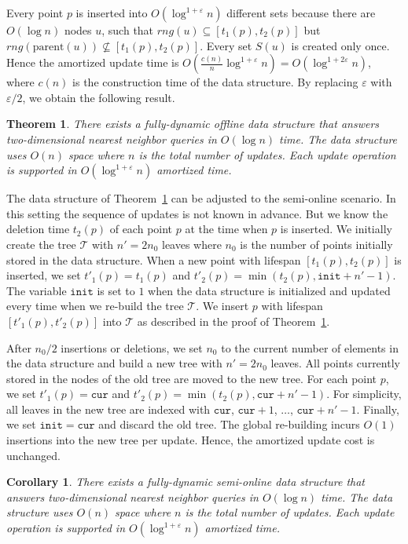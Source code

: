 \documentclass[12pt,a4paper,USenglish,cleveref, autoref, thm-restate]{article}
\newcommand{\cur}{\mathtt{cur}}
\newcommand{\init}{\mathtt{init}}
\newcommand{\mcT}{\mathcal{T}}
\newcommand{\eps}{\varepsilon}
\newtheorem{theorem}{Theorem}
\newtheorem{corollary}{Corollary}
\newcommand{\cur}{\mathtt{cur}}
\newcommand{\init}{\mathtt{init}}
\newcommand{\mcT}{\mathcal{T}}
\newcommand{\eps}{\varepsilon}
\newcommand{\cur}{\mathtt{cur}}
\newcommand{\init}{\mathtt{init}}
\newcommand{\mcT}{\mathcal{T}}
\newcommand{\eps}{\varepsilon}
\begin{document}
Every point $p$ is inserted into $O(\log^{1+\eps} n)$ different sets because there are $O(\log n)$ nodes $u$, such that
$rng(u)\subseteq [t_{1}(p),t_{2}(p)]$ but $rng(\text{parent}(u))\not\subseteq [t_{1}(p),t_{2}(p)]$.  Every set $S(u)$ is created only once.  Hence the amortized update time is $O(\frac{c(n)}{n}\log^{1+\eps} n)=O(\log^{1+2\eps}n)$, where $c(n)$ is the construction time of the data structure. By replacing $\eps$ with $\eps/2$, we obtain the following result.  
\begin{theorem}
  \label{theor:offline}
  There exists a fully-dynamic offline data structure that answers two-dimensional nearest neighbor queries in $O(\log n)$ time. The data structure uses $O(n)$ space where $n$ is the total number of updates. Each update operation is supported in $O(\log^{1+\eps} n)$ amortized time.  
\end{theorem}

The data structure of Theorem~\ref{theor:offline} can be adjusted to the semi-online scenario.  In this setting the sequence of updates is not known in advance. But we know the deletion time $t_2(p)$ of each point $p$ at the time when $p$ is inserted. We initially create  the tree $\mcT$ with $n'=2n_0$ leaves where $n_0$ is the  number of points initially stored in the data structure. When a new point with lifespan $[t_1(p),t_2(p)]$ is inserted, we set $t'_1(p)=t_1(p)$ and $t'_2(p)=\min(t_2(p),\init +n'-1)$. The variable $\init$ is set to $1$ when the data structure is initialized and updated every time when we re-build the tree $\mcT$.  We insert $p$ with lifespan $[t'_1(p),t'_2(p)]$ into $\mcT$  as described in the proof of Theorem~\ref{theor:offline}.


After $n_0/2$ insertions or deletions, we set $n_0$ to the current number of elements in the data structure and  build a new tree with $n'=2n_0$ leaves.  All points currently stored in the nodes of the old tree are moved to the new tree. For each point $p$, we set $t'_{1}(p)=\cur$ and $t'_{2}(p)=\min(t_2(p),\cur+n'-1)$. For simplicity, all leaves in the new tree are indexed with $\cur$, $\cur+1$, $\ldots$, $\cur+n'-1$.  Finally, we set $\init= \cur$ and discard the old tree.  The global re-building incurs $O(1)$ insertions into the new tree per update.  Hence, the amortized update cost is unchanged.
\begin{corollary}
  \label{cor:semi-online}
  There exists a fully-dynamic semi-online data structure that answers two-dimensional nearest neighbor queries in $O(\log n)$ time. The data structure uses $O(n)$ space where $n$ is the total number of updates. Each update operation is supported in $O(\log^{1+\eps} n)$ amortized time.
\end{corollary}
\end{document}
